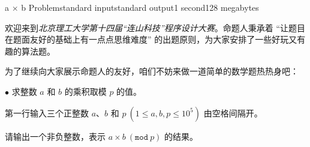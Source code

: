 \begin{problem}{a $\times $ b Problem}{standard input}{standard output}{1 second}{128 megabytes}

    欢迎来到\textit{北京理工大学第十四届“连山科技”程序设计大赛}。命题人秉承着 “让题目在题面友好的基础上有一点点思维难度” 的出题原则，为大家安排了一些好玩又有趣的算法题。
    
    为了继续向大家展示命题人的友好，咱们不妨来做一道简单的数学题热热身吧：

    $\bullet$ 求整数 $a$ 和 $b$ 的乘积取模 $p$ 的值。


    \InputFile
    
    第一行输入三个正整数 $a$、$b$ 和 $p\ (1\le a,b,p\le 10^5)$ 由空格间隔开。

    \OutputFile
    
    请输出一个非负整数，表示 $a\times b\ (\texttt{mod}\ p)$ 的结果。

    \Example
    
    \begin{example}
    \end{example}

\end{problem}